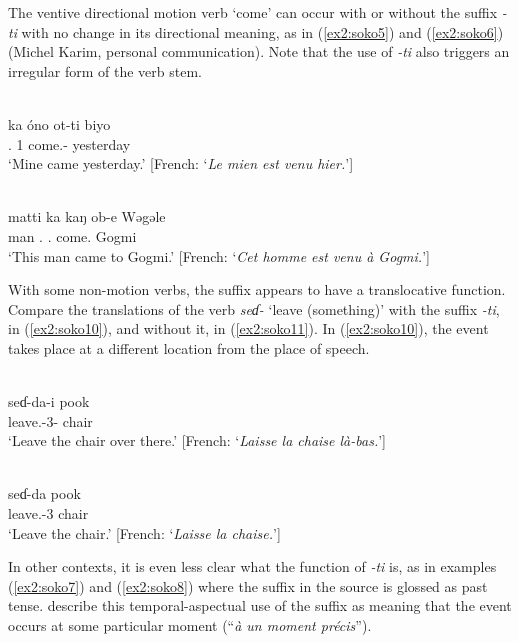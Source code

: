 The ventive directional motion verb ‘come’ can occur with or without the suffix \textit{-ti} with no change in its directional meaning, as in (\ref{ex2:soko5}) and (\ref{ex2:soko6}) (Michel Karim, personal communication). Note that the use of \textit{-ti} also triggers an irregular form of the verb stem.

\ea\label{ex2:soko5}
 \\
\gll ka	óno	ot-ti	biyo	\\
.	1	come.-	yesterday	\\
\glt `Mine came yesterday.' [French: `\textit{Le mien est venu hier.}']

\ex\label{ex2:soko6}
 \\
\gll matti	ka	kaŋ	ob-e	Wəgəle \\
man		.	.	come.	Gogmi \\
\glt `This man came to Gogmi.' [French: `\textit{Cet homme est venu à Gogmi.}']
\z

With some non-motion verbs, the suffix appears to have a translocative function. Compare the translations of the verb \textit{seɗ-} `leave (something)' with the suffix \textit{-ti}, in (\ref{ex2:soko10}), and without it, in (\ref{ex2:soko11}). In (\ref{ex2:soko10}), the event takes place at a different location from the place of speech.

\ea\label{ex2:soko10}
 \\
\gll seɗ-da-i	pook \\
leave.-3-	chair \\
\glt `Leave the chair over there.' [French: `\textit{Laisse la chaise là-bas.}']

\ex\label{ex2:soko11}
 \\
\gll seɗ-da	pook	\\
leave.-3	chair \\	
\glt `Leave the chair.' [French: `\textit{Laisse la chaise.}']
\z 

In other contexts, it is even less clear what the function of \textit{-ti} is, as in examples (\ref{ex2:soko7}) and (\ref{ex2:soko8}) where the suffix in the source is glossed as past tense. \citet[48]{yarangaEsquisseGrammaticaleLangue2019} describe this temporal-aspectual use of the suffix as meaning that the event occurs at some particular moment (``\textit{à un moment précis}'').

